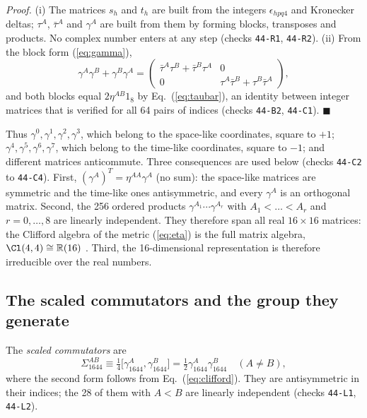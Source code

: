 \emph{Proof.} (i) The matrices $s_h$ and $t_h$ are built from the integers $\epsilon_{hpq4}$ and
Kronecker deltas; $\tau^A$, $\bar\tau^A$ and $\gamma^A$ are built from them by forming blocks,
transposes and products. No complex number enters at any step (checks \texttt{44-R1},
\texttt{44-R2}). (ii) From the block form (\ref{eq:gamma}),
\begin{equation*}
\gamma^A\gamma^B+\gamma^B\gamma^A=\begin{pmatrix}\bar\tau^A\tau^B+\bar\tau^B\tau^A&0\\
0&\tau^A\bar\tau^B+\tau^B\bar\tau^A\end{pmatrix},
\end{equation*}
and both blocks equal $2\eta^{AB}1_8$ by Eq.~(\ref{eq:taubar}), an identity between integer matrices
that is verified for all 64 pairs of indices (checks \texttt{44-B2}, \texttt{44-C1}). $\blacksquare$

Thus $\gamma^0,\gamma^1,\gamma^2,\gamma^3$, which belong to the space-like coordinates, square to $+1$;
$\gamma^4,\gamma^5,\gamma^6,\gamma^7$, which belong to the time-like coordinates, square to $-1$; and
different matrices anticommute. Three consequences are used below (checks \texttt{44-C2} to
\texttt{44-C4}). First, $(\gamma^A)^T=\eta^{AA}\gamma^A$ (no sum): the space-like matrices are
symmetric and the time-like ones antisymmetric, and every $\gamma^A$ is an orthogonal matrix. Second,
the 256 ordered products $\gamma^{A_1}\cdots\gamma^{A_r}$ with $A_1<\dots<A_r$ and $r=0,\dots,8$ are
linearly independent. They therefore span all real $16\times16$ matrices: the Clifford algebra of the
metric (\ref{eq:eta}) is the full matrix algebra, $\Cl(4,4)\cong\mathbb{R}(16)$
\cite{AtiyahBottShapiro1964,LawsonMichelsohn1989}. Third, the 16-dimensional representation is
therefore irreducible over the real numbers.

\subsection{The scaled commutators and the group they generate}
\label{sec:pin}

The \emph{scaled commutators} are
\begin{equation}
\Sigma_{1644}^{AB}\equiv\tfrac14\big[\gamma_{1644}^A,\gamma_{1644}^B\big]
=\tfrac12\gamma_{1644}^A\gamma_{1644}^B\quad(A\neq B),
\label{eq:Sigma}
\end{equation}
where the second form follows from Eq.~(\ref{eq:clifford}). They are antisymmetric in their indices;
the 28 of them with $A<B$ are linearly independent (checks \texttt{44-L1}, \texttt{44-L2}).

